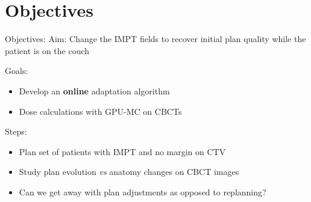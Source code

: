 \section{Objectives}
\begin{frame}[c]{Objectives:}
	Aim: Change the IMPT fields to recover initial plan quality while the patient is on the couch
	
    Goals:
    \begin{itemize}
    	\item Develop an \textbf{online} adaptation algorithm
    	\item Dose calculations with GPU-MC on CBCTs
    \end{itemize}
    \pause
    Steps:
    \begin{itemize}
        \item Plan set of patients with IMPT and no margin on CTV
        \item Study plan evolution \textit{vs} anatomy changes on CBCT images
        \item Can we get away with plan adjustments as opposed to replanning?
    \end{itemize}
\end{frame}


